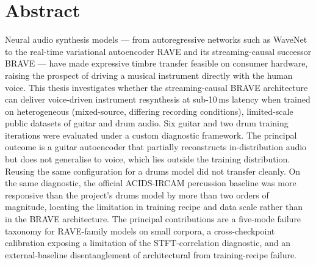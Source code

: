 \documentclass[a4paper,11pt,oneside,openany]{book}
\begin{document}
\chapter*{Abstract}
Neural audio synthesis models --- from autoregressive networks such as WaveNet to the real-time variational autoencoder RAVE and its streaming-causal successor BRAVE --- have made expressive timbre transfer feasible on consumer hardware, raising the prospect of driving a musical instrument directly with the human voice. This thesis investigates whether the streaming-causal BRAVE architecture can deliver voice-driven instrument resynthesis at sub-10\,ms latency when trained on heterogeneous (mixed-source, differing recording conditions), limited-scale public datasets of guitar and drum audio. Six guitar and two drum training iterations were evaluated under a custom diagnostic framework. The principal outcome is a guitar autoencoder that partially reconstructs in-distribution audio but does not generalise to voice, which lies outside the training distribution. Reusing the same configuration for a drums model did not transfer cleanly. On the same diagnostic, the official ACIDS-IRCAM percussion baseline was more responsive than the project's drums model by more than two orders of magnitude, locating the limitation in training recipe and data scale rather than in the BRAVE architecture. The principal contributions are a five-mode failure taxonomy for RAVE-family models on small corpora, a cross-checkpoint calibration exposing a limitation of the STFT-correlation diagnostic, and an external-baseline disentanglement of architectural from training-recipe failure.
\end{document}
